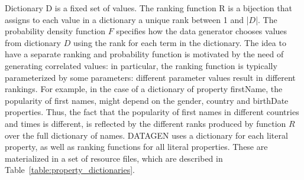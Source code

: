 Dictionary D is a fixed set of values. The ranking function R is a bijection
that assigns to each value in a dictionary a unique rank between 1 and |$D$|.
The probability density function $F$ specifies how the data generator chooses
values from dictionary $D$ using the rank for each term in the dictionary. The
idea to have a separate ranking and probability function is motivated by the
need of generating correlated values: in particular, the ranking function is
typically parameterized by some parameters: different parameter values result
in different rankings. For example, in the case of a dictionary of property
firstName, the popularity of first names, might depend on the gender, country
and birthDate properties. Thus, the fact that the popularity of first names in
different countries and times is different, is reflected by the different ranks
produced by function $R$ over the full dictionary of names.  DATAGEN uses a
dictionary for each literal property, as well as ranking functions for all
literal properties. These are materialized in a set of resource files, which
are described in Table~\ref{table:property_dictionaries}.

